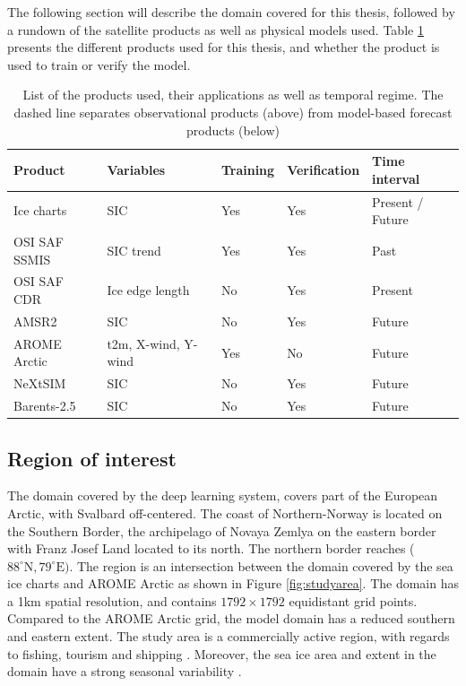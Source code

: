 \documentclass[../main/thesis.tex]{subfiles}
\begin{document}
The following section will describe the domain covered for this thesis, followed by a rundown of the satellite products as well as physical models used. Table \ref{tab:data_overview} presents the different products used for this thesis, and whether the product is used to train or verify the model.

\begin{table}
    \caption{\label{tab:data_overview}List of the products used, their applications as well as temporal regime. The dashed line separates observational products (above) from model-based forecast products (below)}
    \centering
    \setlength{\arrayrulewidth}{0.5mm}
    \renewcommand{\arraystretch}{1.3}
    \begin{tabular}{lllll}
    \hline
    Product             & Variables           & Training & Verification & Time interval\\
    \hline
    Ice charts          & SIC                 & Yes      & Yes & Present / Future         \\
    OSI SAF SSMIS       & SIC trend           & Yes      & Yes & Past          \\
    OSI SAF CDR         & Ice edge length     & No       & Yes & Present         \\
    AMSR2               & SIC                 & No       & Yes & Future         \\
    \hdashline
    AROME Arctic        & t2m, X-wind, Y-wind & Yes      & No  & Future         \\
    NeXtSIM             & SIC                 & No       & Yes & Future         \\
    Barents-2.5         & SIC                 & No       & Yes & Future         \\
    \hline         
    \end{tabular}
\end{table}


\subsection{Region of interest}
\label{sec:roi}
The domain covered by the deep learning system, covers part of the European Arctic, with Svalbard off-centered. The coast of Northern-Norway is located on the Southern Border, the archipelago of Novaya Zemlya on the eastern border with Franz Josef Land located to its north. The northern border reaches ($88^\circ \text{N}, 79^\circ \text{E})$. The region is an intersection between the domain covered by the sea ice charts \citep{Dinessen2020} and AROME Arctic \citep{Mueller2017} as shown in Figure \ref{fig:studyarea}. The domain has a 1km spatial resolution, and contains $1792 \times 1792$ equidistant grid points. Compared to the AROME Arctic grid, the model domain has a reduced southern and eastern extent. The study area is a commercially active region, with regards to fishing, tourism and shipping \citep{Wagner2020}. Moreover, the sea ice area and extent in the domain have a strong seasonal variability \citep{Cavalieri2012}.
\end{document}
